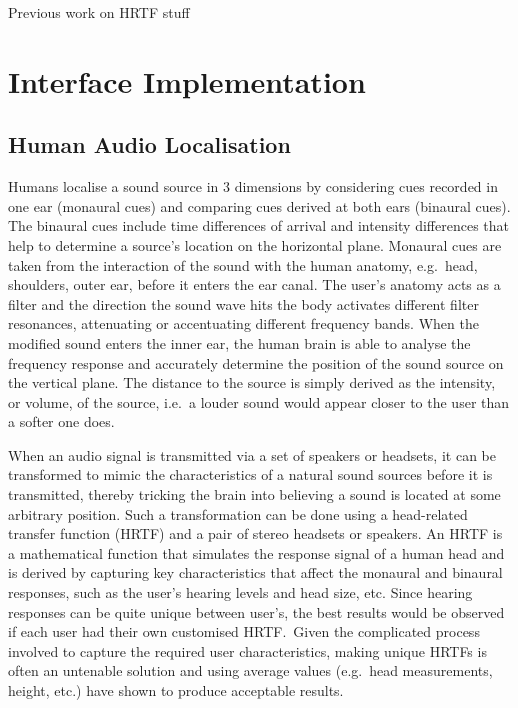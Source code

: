 \documentclass{llncs}
\begin{document}
Previous work on HRTF stuff

\section{Interface Implementation}

\subsection{Human Audio Localisation}

Humans localise a sound source in 3 dimensions by considering cues recorded in one ear (monaural cues) and comparing cues derived at both ears (binaural cues).
The binaural cues include time differences of arrival and intensity differences that help to determine a source's location on the horizontal plane.
Monaural cues are taken from the interaction of the sound with the human anatomy, e.g.\ head, shoulders, outer ear, before it enters the ear canal.
The user's anatomy acts as a filter and the direction the sound wave hits the body activates different filter resonances, attenuating or accentuating different frequency bands.
When the modified sound enters the inner ear, the human brain is able to analyse the frequency response and accurately determine the position of the sound source on the vertical plane. 
The distance to the source is simply derived as the intensity, or volume, of the source, i.e.\ a louder sound would appear closer to the user than a softer one does. 

When an audio signal is transmitted via a set of speakers or headsets, it can be transformed to mimic the characteristics of a natural sound sources before it is transmitted, thereby tricking the brain into believing a sound is located at some arbitrary position.
Such a transformation can be done using a head-related transfer function (HRTF) and a pair of stereo headsets or speakers.
An HRTF is a mathematical function that simulates the response signal of a human head and is derived by capturing key characteristics that affect the monaural and binaural responses, such as the user's hearing levels and head size, etc.
Since hearing responses can be quite unique between user's, the best results would be observed if each user had their own customised HRTF.\
Given the complicated process involved to capture the required user characteristics, making unique HRTFs is often an untenable solution and using average values (e.g.\ head measurements, height, etc.) have shown to produce acceptable results.
\end{document}
